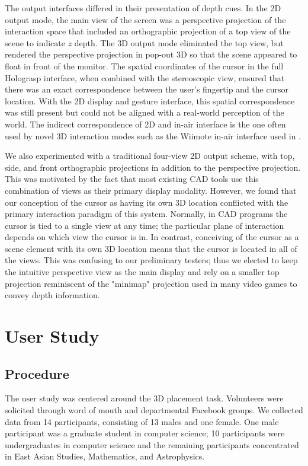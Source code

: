 \documentclass[pageno]{jpaper}
\begin{document}
The output interfaces differed in their presentation of depth cues. In the 2D output mode,
the main view of the screen was a perspective projection of the interaction space that
included an orthographic projection of a top view of the scene to indicate $z$ depth. The 3D output mode eliminated the top
view, but rendered the perspective projection in pop-out 3D so that the scene appeared to
float in front of the monitor. The spatial coordinates of the cursor in the full Holograsp interface, when combined
with the stereoscopic view, ensured that there was an exact correspondence between the user's fingertip
and the cursor location. With the 2D display and gesture interface, this spatial correspondence was still present but could not
be aligned with a real-world perception of the world. The indirect correspondence of 2D and in-air interface is the one
often used by novel 3D interaction modes such as the Wiimote in-air interface used in \cite{study1}.

We also experimented with a traditional four-view 2D output
scheme, with top, side, and front orthographic projections in addition to the perspective projection.
This was motivated by the fact that most existing CAD tools use this combination of views as their
primary display modality. However, we found that our conception of the cursor as having its own
3D location conflicted with the primary interaction paradigm of this system. Normally, in CAD programs
the cursor is tied to a single view at any time; the particular plane of interaction depends on which view
the cursor is in. In contrast, conceiving of the cursor as a scene element with its own 3D location means
that the cursor is located in all of the views. This was confusing to our preliminary testers; thus we elected to keep the intuitive perspective view as the
main display and rely on a smaller top projection reminiscent of the "minimap" projection used in many
video games to convey depth information.

\newpage
\section{User Study}
\label{sec:study}
\subsection{Procedure}
The user study was centered around the 3D placement task. Volunteers were solicited
through word of mouth and departmental Facebook groups. We collected data from 14 participants,
consisting of 13 males and one female. One male participant was a graduate student in computer
science; 10 participants were undergraduates in computer science and the remaining participants
concentrated in East Asian Studies, Mathematics, and Astrophysics.
\end{document}
